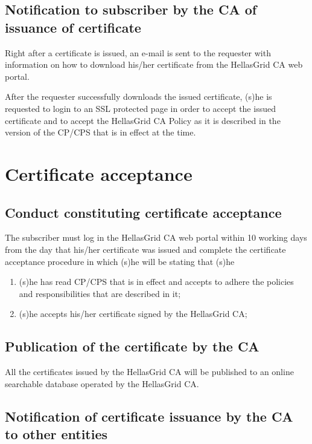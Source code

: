 \subsection{Notification to subscriber by the CA of issuance of certificate}
\label{sub:NotificationToSubscriberByTheCAOfIssuanceOfCertificate}

Right after a certificate is issued, an e-mail is sent to the requester with information on how to download his/her certificate from the HellasGrid CA web portal.

After the requester successfully downloads the issued certificate, (s)he is requested to login to an SSL protected page in order to accept the issued certificate and to accept the HellasGrid CA Policy as it is described in the version of the CP/CPS that is in effect at the time.

\section{Certificate acceptance}
\subsection{Conduct constituting certificate acceptance}
\label{sub:ConductConstitutingCertificateAcceptance}

The subscriber must log in the HellasGrid CA web portal within 10 working days from the day that his/her certificate was issued and complete the certificate acceptance procedure  in which (s)he will be stating that (s)he

\begin{enumerate}
\item{(s)he has read CP/CPS that is in effect and accepts to adhere the policies and responsibilities that are described in it;}
\item{(s)he accepts his/her certificate signed by the HellasGrid CA;}
\end{enumerate}

\subsection{Publication of the certificate by the CA}
\label{sub:PublicationOfTheCertificateByTheCA}

All the certificates issued by the HellasGrid CA will be published to an online searchable database operated by the HellasGrid CA.

\subsection{Notification of certificate issuance by the CA to other entities}
\label{sub:NotificationOfCertificateIssuanceByTheCAToOtherEntities}

